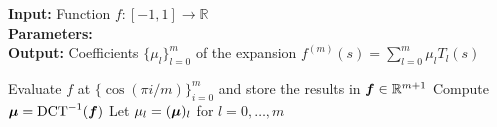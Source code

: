 \hspace*{\algorithmicindent} \textbf{Input:} Function $f:[-1, 1] \to \mathbb{R}$ \\%
\hspace*{\algorithmicindent} \textbf{Parameters:}  \\
\hspace*{\algorithmicindent} \textbf{Output:} Coefficients $\{ \mu_l \}_{l=0}^{m}$ of the expansion $f^{(m)}(s) = \sum_{l=0}^{m} \mu_l T_l(s)$
\begin{algorithmic}[1]
    \State Evaluate $f$ at $\{\cos(\pi i / m)\}_{i=0}^{m}$ and store the results in $\boldsymbol{f}\in \mathbb{R}^{m+1}$
    \State Compute $\boldsymbol{\mu} = \operatorname{DCT}^{-1}(\boldsymbol{f})$
    \State Let $\mu_l = (\boldsymbol{\mu})_l$ for $l=0,\dots,m$
\end{algorithmic}
